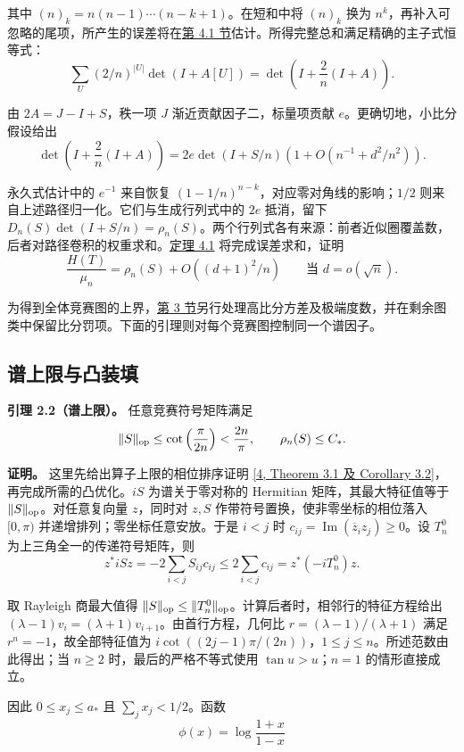 \documentclass[11pt,a4paper]{article}
\makeatletter
\newcommand{\paperstatement}[3]{\par\addvspace{6pt}\Needspace{4\baselineskip}\phantomsection\def\@currentlabel{#2}\label{#3}\noindent\textbf{#1}\enspace}
\newcommand{\paperref}[2]{\hyperref[#1]{#2}}
\makeatother
\begin{document}
其中 \((n)_k=n(n-1)\cdots(n-k+1)\)。在短和中将 \((n)_k\) 换为 \(n^k\)，再补入可忽略的尾项，所产生的误差将在\paperref{sec-4.1}{第 4.1 节}估计。所得完整总和满足精确的主子式恒等式：
\[\sum_U(2/n)^{|U|}\det(I+A[U])
=\det\left(I+\frac2n(I+A)\right).\]

由 \(2A=J-I+S\)，秩一项 \(J\) 渐近贡献因子二，标量项贡献 \(e\)。更确切地，小比分假设给出
\[\det\left(I+\frac2n(I+A)\right)
=2e\det(I+S/n)\left(1+O(n^{-1}+d^2/n^2)\right).\]

永久式估计中的 \(e^{-1}\) 来自恢复 \((1-1/n)^{n-k}\)，对应零对角线的影响；\(1/2\) 则来自上述路径归一化。它们与生成行列式中的 \(2e\) 抵消，留下 \(D_n(S)\det(I+S/n)=\rho_n(S)\)。两个行列式各有来源：前者近似圈覆盖数，后者对路径卷积的权重求和。\paperref{thm-4.1}{定理 4.1} 将完成误差求和，证明
\[\frac{H(T)}{\mu_n}=\rho_n(S)+O((d+1)^2/n)
\qquad\text{当 }d=o(\sqrt n).\]

为得到全体竞赛图的上界，\paperref{sec-3}{第 3 节}另行处理高比分方差及极端度数，并在剩余图类中保留比分罚项。下面的引理则对每个竞赛图控制同一个谱因子。

\subsection{谱上限与凸装填}\label{sec-2.4}

\paperstatement{引理 2.2（谱上限）。}{2.2}{thm-2.2} 任意竞赛符号矩阵满足
\[\|S\|_{\rm op}\le\cot\left(\frac{\pi}{2n}\right)<\frac{2n}{\pi},
\qquad \rho_n(S)\le C_*.\]

\textbf{证明。} 这里先给出算子上限的相位排序证明 \paperref{bib-4}{[4, Theorem 3.1 及 Corollary 3.2]}，再完成所需的凸优化。\(iS\) 为谱关于零对称的 Hermitian 矩阵，其最大特征值等于 \(\|S\|_{\rm op}\)。对任意复向量 \(z\)，同时对 \(z,S\) 作带符号置换，使非零坐标的相位落入 \([0,\pi)\) 并递增排列；零坐标任意安放。于是 \(i<j\) 时 \(c_{ij}=\operatorname{Im}(\overline z_i z_j)\ge0\)。设 \(T_n^0\) 为上三角全一的传递符号矩阵，则
\[z^*iSz=-2\sum_{i<j}S_{ij}c_{ij}
\le2\sum_{i<j}c_{ij}=z^*(-iT_n^0)z.\]

取 Rayleigh 商最大值得 \(\|S\|_{\rm op}\le\|T_n^0\|_{\rm op}\)。计算后者时，相邻行的特征方程给出 \((\lambda-1)v_i=(\lambda+1)v_{i+1}\)。由首行方程，几何比 \(r=(\lambda-1)/(\lambda+1)\) 满足 \(r^n=-1\)，故全部特征值为 \(i\cot((2j-1)\pi/(2n))\)，\(1\le j\le n\)。所述范数由此得出；当 \(n\ge2\) 时，最后的严格不等式使用 \(\tan u>u\)；\(n=1\) 的情形直接成立。

因此 \(0\le x_j\le a_*\) 且 \(\sum_jx_j<1/2\)。函数
\[\phi(x)=\log\frac{1+x}{1-x}\]
\end{document}
